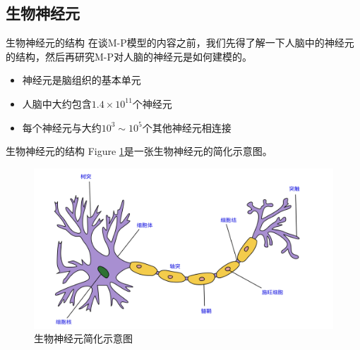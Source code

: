 \documentclass[xcolor=svgnames]{beamer}
\begin{document}
\subsection{生物神经元}

\begin{frame}{生物神经元的结构}
  \setlength\parindent{2em}
  在谈M-P模型的内容之前，我们先得了解一下人脑中的神经元的结构，然后再研究M-P对人脑的神经元是如何建模的。
  \begin{itemize}
  \item 神经元是脑组织的基本单元
  \item 人脑中大约包含$1.4\times 10^{11}$个神经元
  \item 每个神经元与大约$10^3\sim 10^5$个其他神经元相连接
  \end{itemize}
\end{frame}

\begin{frame}{生物神经元的结构}
  Figure \ref{fig:cell}是一张生物神经元的简化示意图。

  \begin{figure}
    \centering
    \includegraphics[width=.9\textwidth]{fig28.png}
    \vspace{-1em}
    \caption{生物神经元简化示意图}
    \label{fig:cell}
  \end{figure}
\end{frame}
\end{document}
